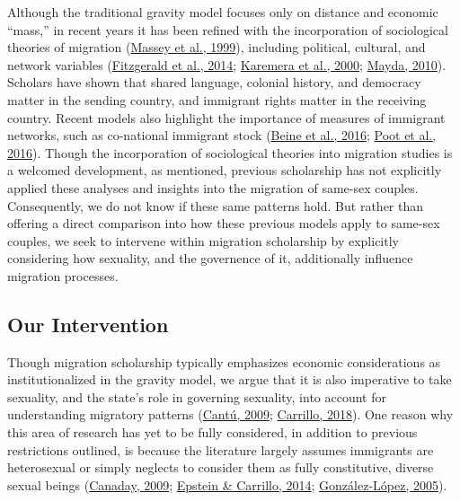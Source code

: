 \documentclass[
  11pt,
]{article}
\begin{document}
Although the traditional gravity model focuses only on distance and economic ``mass,'' in recent years it has been refined with the incorporation of sociological theories of migration (\protect\hyperlink{ref-massey_1999}{Massey et al., 1999}), including political, cultural, and network variables (\protect\hyperlink{ref-fitzgerald_2014}{Fitzgerald et al., 2014}; \protect\hyperlink{ref-karemera_2000}{Karemera et al., 2000}; \protect\hyperlink{ref-mayda_2010}{Mayda, 2010}). Scholars have shown that shared language, colonial history, and democracy matter in the sending country, and immigrant rights matter in the receiving country. Recent models also highlight the importance of measures of immigrant networks, such as co-national immigrant stock (\protect\hyperlink{ref-beine_2016}{Beine et al., 2016}; \protect\hyperlink{ref-poot_2016}{Poot et al., 2016}). Though the incorporation of sociological theories into migration studies is a welcomed development, as mentioned, previous scholarship has not explicitly applied these analyses and insights into the migration of same-sex couples. Consequently, we do not know if these same patterns hold. But rather than offering a direct comparison into how these previous models apply to same-sex couples, we seek to intervene within migration scholarship by explicitly considering how sexuality, and the governence of it, additionally influence migration processes.

\hypertarget{our-intervention}{%
\subsection{Our Intervention}\label{our-intervention}}

Though migration scholarship typically emphasizes economic considerations as institutionalized in the gravity model, we argue that it is also imperative to take sexuality, and the state's role in governing sexuality, into account for understanding migratory patterns (\protect\hyperlink{ref-cantu_2009}{Cantú, 2009}; \protect\hyperlink{ref-carrillo_2018}{Carrillo, 2018}). One reason why this area of research has yet to be fully considered, in addition to previous restrictions outlined, is because the literature largely assumes immigrants are heterosexual or simply neglects to consider them as fully constitutive, diverse sexual beings (\protect\hyperlink{ref-canaday_2009}{Canaday, 2009}; \protect\hyperlink{ref-epstein_2014}{Epstein \& Carrillo, 2014}; \protect\hyperlink{ref-gonzalez-lopez_2005}{González-López, 2005}).
\end{document}
